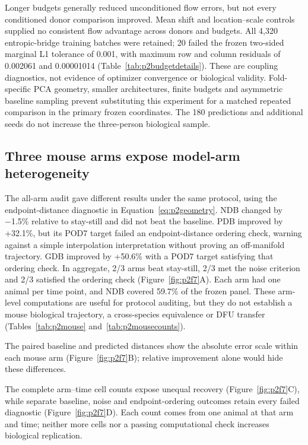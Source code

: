 Longer budgets generally reduced unconditioned flow errors, but not every conditioned donor comparison improved. Mean shift and location--scale controls supplied no consistent flow advantage across donors and budgets. All 4,320 entropic-bridge training batches were retained; 20 failed the frozen two-sided marginal L1 tolerance of 0.001, with maximum row and column residuals of 0.002061 and 0.00001014 (Table~\ref{tab:p2budgetdetails}). These are coupling diagnostics, not evidence of optimizer convergence or biological validity. Fold-specific PCA geometry, smaller architectures, finite budgets and asymmetric baseline sampling prevent substituting this experiment for a matched repeated comparison in the primary frozen coordinates. The 180 predictions and additional seeds do not increase the three-person biological sample.

\subsection{Three mouse arms expose model-arm heterogeneity}

The all-arm audit gave different results under the same protocol, using the endpoint-distance diagnostic in Equation~\eqref{eq:p2geometry}. NDB changed by −1.5\% relative to stay-still and did not beat the baseline. PDB improved by +32.1\%, but its POD7 target failed an endpoint-distance ordering check, warning against a simple interpolation interpretation without proving an off-manifold trajectory. GDB improved by +50.6\% with a POD7 target satisfying that ordering check. In aggregate, 2/3 arms beat stay-still, 2/3 met the noise criterion and 2/3 satisfied the ordering check (Figure~\ref{fig:p2f7}A\label{call:p2f7}). Each arm had one animal per time point, and NDB covered 59.7\% of the frozen panel. These arm-level computations are useful for protocol auditing, but they do not establish a mouse biological trajectory, a cross-species equivalence or DFU transfer (Tables~\ref{tab:p2mouse} and~\ref{tab:p2mousecounts}).

The paired baseline and predicted distances show the absolute error scale within each mouse arm (Figure~\ref{fig:p2f7}B); relative improvement alone would hide these differences.

The complete arm--time cell counts expose unequal recovery (Figure~\ref{fig:p2f7}C), while separate baseline, noise and endpoint-ordering outcomes retain every failed diagnostic (Figure~\ref{fig:p2f7}D). Each count comes from one animal at that arm and time; neither more cells nor a passing computational check increases biological replication.

